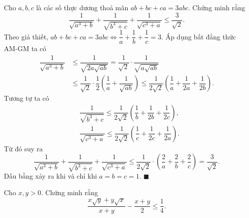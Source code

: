 \begin{bt}%
	Cho $a,b,c$ là các số thực dương thoả mãn $ab+bc+ca=3abc$. Chứng minh rằng
	$$\dfrac{1}{\sqrt{a^{3}+b}}+\dfrac{1}{\sqrt{b^3+c}}+\dfrac{1}{\sqrt{c^3+a}}\leq \frac{3}{\sqrt{2}}.$$
	\loigiai
	{
		Theo giả thiết, $ab+bc+ca=3abc\Leftrightarrow \dfrac{1}{a}+\dfrac{1}{b}+\dfrac{1}{c}=3.$
		Áp dụng bất đẳng thức AM-GM ta có
		$$\begin{aligned}
		\dfrac{1}{\sqrt{a^{3}+b}}&\le \dfrac{1}{\sqrt{2a\sqrt{ab}}}=\dfrac{1}{\sqrt{2}}\cdot\dfrac{1}{\sqrt{a\sqrt{ab}}}\\ 
		&\le \dfrac{1}{\sqrt{2}}\cdot\dfrac{1}{2}\left(\dfrac{1}{a}+\dfrac{1}{\sqrt{ab}}\right)\le \dfrac{1}{2\sqrt{2}}\left(\dfrac{1}{a}+\dfrac{1}{2a}+\dfrac{1}{2b}\right).
		\end{aligned}$$
		Tương tự ta có $$\begin{aligned}
		&\dfrac{1}{\sqrt{b^3+c}}\le \dfrac{1}{2\sqrt{2}}\left(\dfrac{1}{b}+\dfrac{1}{2b}+\dfrac{1}{2c}\right),\\ 
		&\dfrac{1}{\sqrt{c^3+a}}\le \dfrac{1}{2\sqrt{2}}\left(\dfrac{1}{c}+\dfrac{1}{2c}+\dfrac{1}{2a}\right).
		\end{aligned}$$
		Từ đó suy ra $$\dfrac{1}{\sqrt{a^{3}+b}}+\dfrac{1}{\sqrt{b^3+c}}+\dfrac{1}{\sqrt{c^3+a}}\leq \dfrac{1}{2\sqrt{2}}\cdot\left(\dfrac{2}{a}+\dfrac{2}{b}+\dfrac{2}{c}\right)=\frac{3}{\sqrt{2}}.$$
		Dấu bằng xảy ra khi và chỉ khi $a=b=c=1.$
		$\blacksquare$
	}
\end{bt}

\begin{bt} %
	Cho $x,y>0$. Chứng minh rằng$$\frac{x\sqrt{y}+y\sqrt{x}}{x+y}-\frac{x+y}{2}\leqslant \frac{1}{4}.$$
\end{bt}

